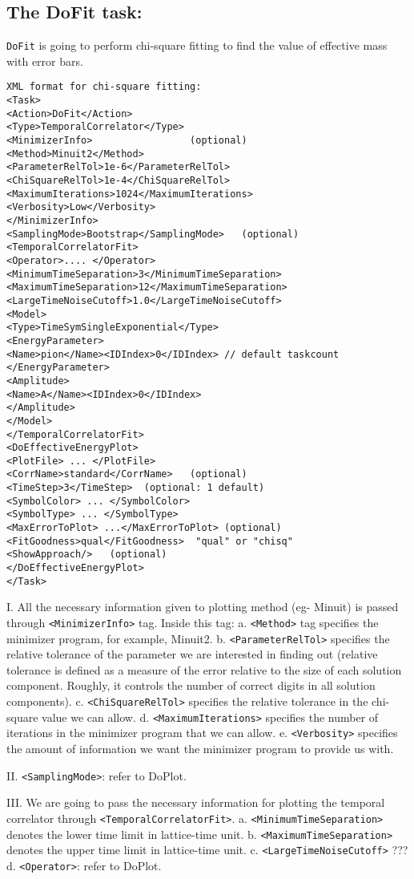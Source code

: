 \documentclass[12pt]{article}
\newcommand{\vb}{\texttt}
\begin{document}
\subsection{The DoFit task:}
\vb{DoFit} is going to perform chi-square fitting to find the value of effective mass with error bars.
\begin{verbatim}
XML format for chi-square fitting:
<Task>
<Action>DoFit</Action>
<Type>TemporalCorrelator</Type>
<MinimizerInfo>                 (optional)
<Method>Minuit2</Method>
<ParameterRelTol>1e-6</ParameterRelTol>
<ChiSquareRelTol>1e-4</ChiSquareRelTol> <MaximumIterations>1024</MaximumIterations>
<Verbosity>Low</Verbosity>
</MinimizerInfo>
<SamplingMode>Bootstrap</SamplingMode>   (optional)
<TemporalCorrelatorFit>
<Operator>.... </Operator>
<MinimumTimeSeparation>3</MinimumTimeSeparation>
<MaximumTimeSeparation>12</MaximumTimeSeparation>
<LargeTimeNoiseCutoff>1.0</LargeTimeNoiseCutoff>
<Model>
<Type>TimeSymSingleExponential</Type>
<EnergyParameter>
<Name>pion</Name><IDIndex>0</IDIndex> // default taskcount
</EnergyParameter>
<Amplitude>
<Name>A</Name><IDIndex>0</IDIndex>
</Amplitude>
</Model>
</TemporalCorrelatorFit>
<DoEffectiveEnergyPlot>
<PlotFile> ... </PlotFile>
<CorrName>standard</CorrName>   (optional)
<TimeStep>3</TimeStep>  (optional: 1 default)
<SymbolColor> ... </SymbolColor>
<SymbolType> ... </SymbolType>
<MaxErrorToPlot> ...</MaxErrorToPlot> (optional)
<FitGoodness>qual</FitGoodness>  "qual" or "chisq"
<ShowApproach/>   (optional)
</DoEffectiveEnergyPlot>
</Task>
\end{verbatim}
I. All the necessary information given to plotting method (eg- Minuit) is passed through \vb{<MinimizerInfo>} tag. Inside this tag:
a. \vb{<Method>} tag specifies the minimizer program, for example, Minuit2.
b. \vb{<ParameterRelTol>} specifies the relative tolerance of the parameter we are interested in finding out (relative tolerance is defined as a measure of the error relative to the size of each solution component. Roughly, it controls the number of correct digits in all solution components).
c. \vb{<ChiSquareRelTol>} specifies the relative tolerance in the chi-square value we can allow.
d. \vb{<MaximumIterations>} specifies the number of iterations in the minimizer program that we can allow.
e. \vb{<Verbosity>} specifies the amount of information we want the minimizer program to provide us with.

II. \vb{<SamplingMode>}: refer to DoPlot.

III. We are going to pass the necessary information for plotting the temporal correlator through \vb{<TemporalCorrelatorFit>}.
a. \vb{<MinimumTimeSeparation>} denotes  the lower time limit in lattice-time unit.
b. \vb{<MaximumTimeSeparation>} denotes the upper time limit in lattice-time unit.
c.  \vb{<LargeTimeNoiseCutoff>}  ???
d. \vb{<Operator>}: refer to DoPlot.
\end{document}
